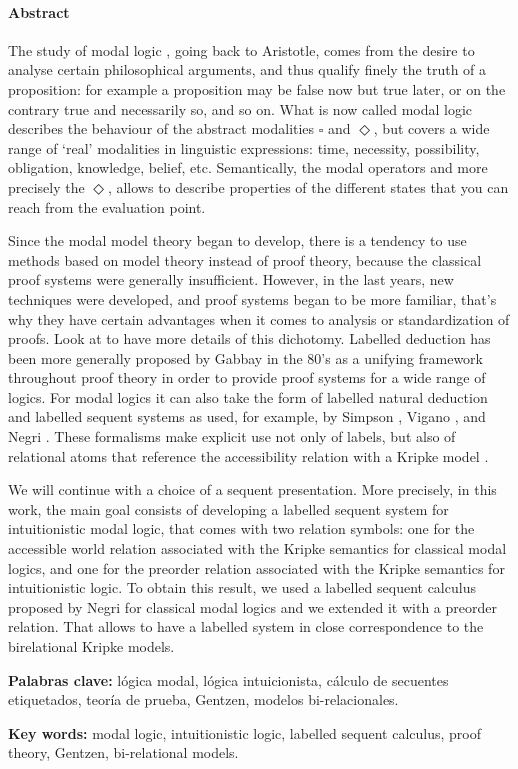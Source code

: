 \paragraph{Abstract}


The study of modal logic \cite{blackburn01}, going back to Aristotle, comes from the desire to analyse certain philosophical arguments, and thus qualify finely the truth of a proposition: for example a proposition may be false now but true later, or on the contrary true and necessarily so, and so on. What is now called modal logic describes the behaviour of the abstract modalities $\square$ and $\Diamond$, but covers a wide range of ‘real’ modalities in linguistic expressions: time, necessity, possibility, obligation, knowledge, belief, etc. Semantically, the modal operators and more precisely the $\Diamond$, allows to describe properties of the different states that you can reach from the evaluation point. 

Since the modal model theory began to develop, there is a tendency to use methods based on model theory instead of proof theory, because the classical proof systems were generally insufficient. However, in the last years, new techniques were developed, and proof systems began to be more familiar, that’s why they have certain advantages when it comes to analysis or standardization of proofs. Look at \cite{negri2005} to have more details of this dichotomy. Labelled deduction has been more generally proposed by Gabbay \cite{gabbay1996} in the 80’s as a unifying framework throughout proof theory in order to provide proof systems for a wide range of logics. For modal logics it can also take the form of labelled natural deduction and labelled sequent systems as used, for example, by Simpson \cite{simpson1994}, Vigano \cite{vigano2013}, and Negri \cite{negri2005}. These formalisms make explicit use not only of labels, but also of relational atoms that reference the accessibility relation with a Kripke model \cite{kripke1959}. 

We will continue with a choice of a sequent presentation. More precisely, in this work, the main goal consists of developing a labelled sequent system for intuitionistic modal logic, that comes with two relation symbols: one for the accessible world relation associated with the Kripke semantics for classical modal logics, and one for the preorder relation associated with the Kripke semantics for intuitionistic logic. To obtain this result, we used a labelled sequent calculus proposed by Negri \cite{negri2005} for classical modal logics and we extended it with a preorder relation. That allows to have a labelled system in close correspondence to the birelational Kripke models. 

\bigskip
\bigskip
\bigskip


\textbf{Palabras clave:} lógica modal, lógica intuicionista, cálculo de secuentes etiquetados, teoría de prueba, Gentzen, modelos bi-relacionales.


\textbf{Key words:} modal logic, intuitionistic logic, labelled sequent calculus, proof theory, Gentzen, bi-relational models.